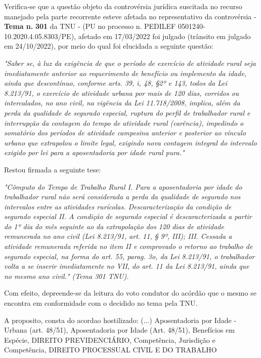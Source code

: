 \documentclass[12pt]{article}
\begin{document}
\justifying
\noindent Verifica-se que a questão objeto da controvérsia jurídica suscitada no recurso manejado pela parte recorrente esteve afetada no representativo da controvérsia - \textbf{Tema n. }\textbf{301} da TNU - (PU no processo n. PEDILEF 0501240-10.2020.4.05.8303/PE),  afetado em 17/03/2022 foi julgado (trânsito em julgado em 24/10/2022), por meio do qual foi elucidada a seguinte questão:

\noindent \textit{"Saber se, à luz da exigência de que o período de exercício de atividade rural seja imediatamente anterior ao requerimento de benefício ou implemento da idade, ainda que descontínuo, conforme arts. 39, i, 48, §2º e 143, todos da Lei 8.213/91, o exercício de atividade urbana por mais de 120 dias, corridos ou intercalados, no ano civil, na vigência da Lei 11.718/2008, implica, além da perda da qualidade de segurado especial, ruptura do perfil de trabalhador rural e interrupção da contagem do tempo de atividade rural (carência), impedindo o somatório dos períodos de atividade campesina anterior e posterior ao vínculo urbano que extrapolou o limite legal, exigindo nova contagem integral do intervalo exigido por lei para a aposentadoria por idade rural pura."}

\noindent Restou firmada a seguinte tese:

\noindent \textit{"Cômputo do Tempo de Trabalho Rural I. Para a aposentadoria por idade do trabalhador rural não será considerada a perda da qualidade de segurado nos intervalos entre as atividades rurícolas. Descaracterização da condição de segurado especial II. A condição de segurado especial é descaracterizada a partir do 1º dia do mês seguinte ao da extrapolação dos 120 dias de atividade remunerada no ano civil (Lei 8.213/91, art. 11, § 9º, III); III. Cessada a atividade remunerada referida no item II e comprovado o retorno ao trabalho de segurado especial, na forma do art. 55, parag. 3o, da Lei 8.213/91, o trabalhador volta a se inserir imediatamente no VII, do art. 11 da Lei 8.213/91, ainda que no mesmo ano civil." (Tema 301 TNU).}

\noindent Com efeito, depreende-se da leitura do voto condutor do acórdão que o mesmo se encontra em conformidade com o decidido no  tema pela TNU.

\noindent A proposito, consta do acordao hostilizado: (...) Aposentadoria por Idade - Urbana (art. 48/51), Aposentadoria por Idade (Art. 48/51), Benefícios em Espécie, DIREITO PREVIDENCIÁRIO, Competência, Jurisdição e Competência, DIREITO PROCESSUAL CIVIL E DO TRABALHO
\end{document}
